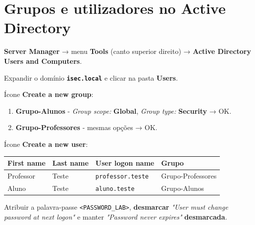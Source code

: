 
\section[Grupos e utilizadores no Active Directory]{Grupos e utilizadores no Active Directory}


\textbf{Server Manager} → menu \textbf{Tools} (canto superior direito) → \textbf{Active Directory Users and Computers}.


Expandir o domínio \textbf{\texttt{isec.local}} e clicar na pasta \textbf{Users}.


Ícone \textbf{Create a new group}:

\begin{enumerate}
\item \textbf{Grupo-Alunos} - \emph{Group scope:} \textbf{Global}, \emph{Group type:} \textbf{Security} → OK.
\item \textbf{Grupo-Professores} - mesmas opções → OK.
\end{enumerate}


Ícone \textbf{Create a new user}:

\begin{center}\small
\begin{tabularx}{\linewidth}{|>{\raggedright\arraybackslash}X|>{\raggedright\arraybackslash}X|>{\raggedright\arraybackslash}X|>{\raggedright\arraybackslash}X|}
\hline
\rowcolor{azul!10}\textbf{First name} & \textbf{Last name} & \textbf{User logon name} & \textbf{Grupo} \\
\hline
Professor & Teste & \texttt{professor.teste} & Grupo-Professores \\
\hline
Aluno & Teste & \texttt{aluno.teste} & Grupo-Alunos \\
\hline
\end{tabularx}
\end{center}


Atribuir a palavra-passe \texttt{\textless{}PASSWORD\_LAB\textgreater{}}, \textbf{desmarcar} \emph{"User must change password at next logon"} e manter \emph{"Password never expires"} \textbf{desmarcada}.

